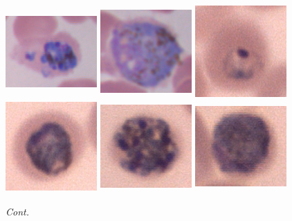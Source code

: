 \documentclass[sensors,review,accept,moreauthors,pdftex,10pt,a4paper]{mdpi}
\begin{document}
\begin{figure}[H]
	\includegraphics[width=3.5cm, height=3.5cm]{img/ovale_3_schizont}
	\includegraphics[width=3.5cm, height=3.5cm]{img/ovale_4_gametocyte}
	\includegraphics[width=3.5cm, height=3.5cm]{img/malariae_1_ring}
	\includegraphics[width=3.5cm, height=3.5cm]{img/malariae_2_trophozoite}
	\includegraphics[width=3.5cm, height=3.5cm]{img/malariae_3_schizont}
	\includegraphics[width=3.5cm, height=3.5cm]{img/malariae_4_gametocyte}
	\caption{\textit{Cont.}}
\end{figure}
\end{document}
